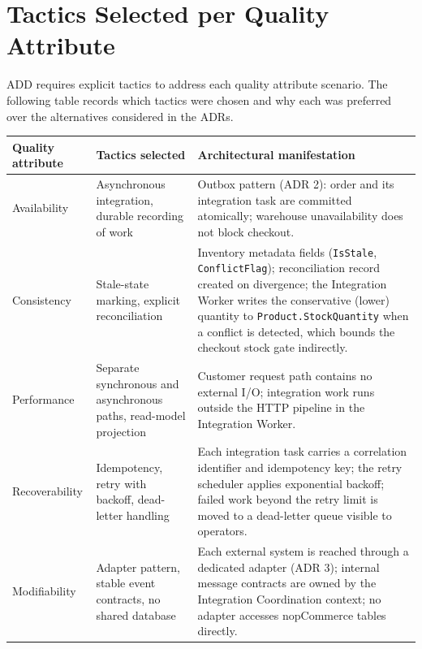 \section{Tactics Selected per Quality Attribute}

ADD requires explicit tactics to address each quality attribute scenario. The following table
records which tactics were chosen and why each was preferred over the alternatives
considered in the ADRs.

\begingroup
\small
\setlength{\tabcolsep}{4pt}
\renewcommand{\arraystretch}{1.15}
\begin{center}
\begin{tabular}{|p{}|p{}|p{}|}
\hline
\textbf{Quality attribute} & \textbf{Tactics selected} & \textbf{Architectural manifestation} \\
\hline
Availability & Asynchronous integration, durable recording of work & Outbox pattern (ADR 2): order and its integration task are committed atomically; warehouse unavailability does not block checkout. \\
\hline
Consistency & Stale-state marking, explicit reconciliation & Inventory metadata fields (\texttt{IsStale}, \texttt{ConflictFlag}); reconciliation record created on divergence; the Integration Worker writes the conservative (lower) quantity to \texttt{Product.StockQuantity} when a conflict is detected, which bounds the checkout stock gate indirectly. \\
\hline
Performance & Separate synchronous and asynchronous paths, read-model projection & Customer request path contains no external I/O; integration work runs outside the HTTP pipeline in the Integration Worker. \\
\hline
Recoverability & Idempotency, retry with backoff, dead-letter handling & Each integration task carries a correlation identifier and idempotency key; the retry scheduler applies exponential backoff; failed work beyond the retry limit is moved to a dead-letter queue visible to operators. \\
\hline
Modifiability & Adapter pattern, stable event contracts, no shared database & Each external system is reached through a dedicated adapter (ADR 3); internal message contracts are owned by the Integration Coordination context; no adapter accesses nopCommerce tables directly. \\
\hline
\end{tabular}
\end{center}
\endgroup

